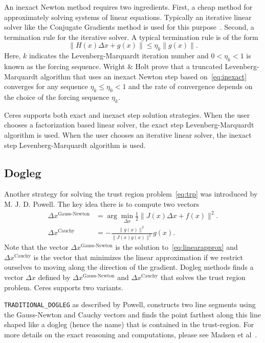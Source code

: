 An inexact Newton method requires two ingredients. First, a cheap method for approximately solving systems of linear equations. Typically an iterative linear solver like the Conjugate Gradients method is used for this purpose~\cite{nocedal2000numerical}. Second, a termination rule for the iterative solver. A typical termination rule is of the form
\begin{equation}
        \|H(x) \Delta x + g(x)\| \leq \eta_k \|g(x)\|. \label{eq:inexact}
\end{equation}
Here, $k$ indicates the Levenberg-Marquardt iteration number and $0 < \eta_k <1$ is known as the forcing sequence.  Wright \& Holt \cite{wright1985inexact} prove that a truncated Levenberg-Marquardt algorithm that uses an inexact Newton step based on~\eqref{eq:inexact} converges for any sequence $\eta_k \leq \eta_0 < 1$ and the rate of convergence depends on the choice of the forcing sequence $\eta_k$.

Ceres supports both exact and inexact step solution strategies. When the user chooses a factorization based linear solver, the exact step Levenberg-Marquardt algorithm is used. When the user chooses an iterative linear solver, the inexact step Levenberg-Marquardt algorithm is used.

\subsection{Dogleg}
\label{sec:dogleg}
Another strategy for solving the trust region problem~\eqref{eq:trp} was introduced by M. J. D. Powell. The key idea there is to compute two vectors
\begin{align}
        \Delta x^{\text{Gauss-Newton}} &= \arg \min_{\Delta x}\frac{1}{2} \|J(x)\Delta x + f(x)\|^2.\\
        \Delta x^{\text{Cauchy}} &= -\frac{\|g(x)\|^2}{\|J(x)g(x)\|^2}g(x).
\end{align}
Note that the vector $\Delta x^{\text{Gauss-Newton}}$ is the solution
to~\eqref{eq:linearapprox} and $\Delta x^{\text{Cauchy}}$ is the
vector that minimizes the linear approximation if we restrict
ourselves to moving along the direction of the gradient. Dogleg methods finds a vector $\Delta x$ defined by $\Delta
x^{\text{Gauss-Newton}}$ and $\Delta x^{\text{Cauchy}}$ that solves
the trust region problem. Ceres supports two
variants.

\texttt{TRADITIONAL\_DOGLEG} as described by Powell,
constructs two line segments using the Gauss-Newton and Cauchy vectors
and finds the point farthest along this line shaped like a dogleg
(hence the name) that is contained in the
trust-region. For more details on the exact reasoning and computations, please see Madsen et al~\cite{madsen2004methods}.

